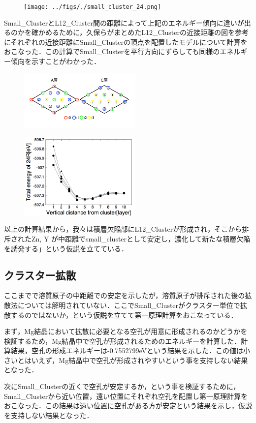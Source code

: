 \documentclass[10pt,a4j]{article}
\begin{document}
\begin{figure}[htbp]\begin{center}
\texttt{[image: ../figs/./small\_cluster\_24.png]}
\caption{}
\label{default}\end{center}\end{figure}
Small\_ClusterとL12\_Cluster間の距離によって上記のエネルギー傾向に違いが出るのかを確かめるために，久保らがまとめたL12\_Clusterの近接距離の図を参考にそれぞれの近接距離にSmall\_Clusterの頂点を配置したモデルについて計算をおこなった．この計算でSmall\_Clusterを平行方向にずらしても同様のエネルギー傾向を示すことがわかった．

\begin{figure}[htbp]\begin{center}
\includegraphics[width=6cm,bb=0 0 442 500]{../figs/./distance_from_cluster.png}
\caption{}
\label{default}\end{center}\end{figure}
\begin{figure}[htbp]\begin{center}
\includegraphics[width=6cm,bb=0 0 442 500]{../figs/./small_cluster_Alld.png}
\caption{}
\label{default}\end{center}\end{figure}
以上の計算結果から，我々は積層欠陥部にL12\_Clusterが形成され，そこから排斥されたZn, Y が中距離でsmall\_clusterとして安定し，濃化して新たな積層欠陥を誘発する」という仮説を立てている．

\subsection{クラスター拡散}
ここまでで溶質原子の中距離での安定を示したが，溶質原子が排斥された後の拡散法については解明されていない．ここでSmall\_Clusterがクラスター単位で拡散するのではないか，という仮説を立てて第一原理計算をおこなっている．

まず，Mg結晶において拡散に必要となる空孔が用意に形成されるのかどうかを検証するため，Mg結晶中で空孔が形成されるためのエネルギーを計算した．計算結果，空孔の形成エネルギーは-0.7552799eVという結果を示した．この値は小さいとはいえず，Mg結晶中で空孔が形成されやすいという事を支持しない結果となった．

次にSmall\_Clusterの近くで空孔が安定するか，という事を検証するために，Small\_Clusterから近い位置，遠い位置にそれぞれ空孔を配置し第一原理計算をおこなった．この結果は遠い位置に空孔がある方が安定という結果を示し，仮説を支持しない結果となった．
\end{document}
